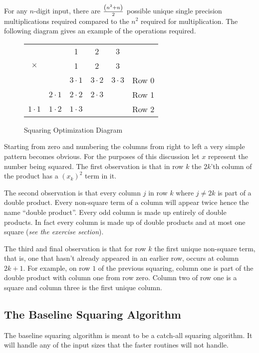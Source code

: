 \documentclass[b5paper]{book}
\begin{document}
For any $n$-digit input, there are ${{\left (n^2 + n \right)}\over 2}$ possible unique single precision multiplications required compared to the $n^2$
required for multiplication.  The following diagram gives an example of the operations required.

\begin{figure}[here]
\begin{center}
\begin{tabular}{ccccc|c}
&&1&2&3&\\
$\times$ &&1&2&3&\\
\hline && $3 \cdot 1$ & $3 \cdot 2$ & $3 \cdot 3$ & Row 0\\
       & $2 \cdot 1$  & $2 \cdot 2$ & $2 \cdot 3$ && Row 1 \\
         $1 \cdot 1$  & $1 \cdot 2$ & $1 \cdot 3$ &&& Row 2 \\
\end{tabular}
\end{center}
\caption{Squaring Optimization Diagram}
\end{figure}

Starting from zero and numbering the columns from right to left a very simple pattern becomes obvious.  For the purposes of this discussion let $x$
represent the number being squared.  The first observation is that in row $k$ the $2k$'th column of the product has a $\left (x_k \right)^2$ term in it.  

The second observation is that every column $j$ in row $k$ where $j \ne 2k$ is part of a double product.  Every non-square term of a column will
appear twice hence the name ``double product''.  Every odd column is made up entirely of double products.  In fact every column is made up of double 
products and at most one square (\textit{see the exercise section}).  

The third and final observation is that for row $k$ the first unique non-square term, that is, one that hasn't already appeared in an earlier row, 
occurs at column $2k + 1$.  For example, on row $1$ of the previous squaring, column one is part of the double product with column one from row zero. 
Column two of row one is a square and column three is the first unique column.

\subsection{The Baseline Squaring Algorithm}
The baseline squaring algorithm is meant to be a catch-all squaring algorithm.  It will handle any of the input sizes that the faster routines
will not handle.  
\end{document}
